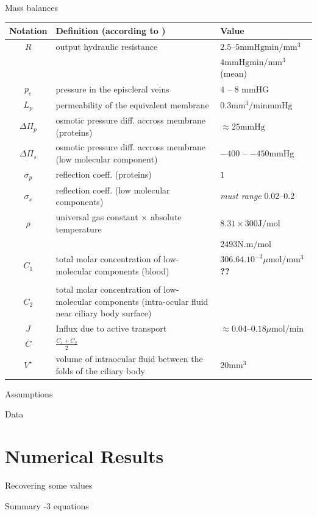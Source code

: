 \documentclass[9pt]{beamer}
\begin{document}
\begin{frame}{Mass balances}
\begin{tabular}{|c|p{}|l|}
\hline
Notation & Definition (according to \cite{lyubimov2007dynamics}) & Value \\
\hline
\hline
 $R$ & output hydraulic resistance & $2.5$--$5 \mathrm{mmHgmin}/\mathrm{mm}^3$ \cite{lyubimov2007dynamics}\\
 && $4\mathrm{mmHgmin}/\mathrm{mm}^3$ (mean) \cite{bill1975blood}\\
 \hline
 $p_e$ & pressure in the episcleral veins & $4$ -- $8$ $\mathrm{mmHG} $\\
 \hline
 $L_p$ & permeability of the equivalent membrane & $0.3 \mathrm{mm^3}/\mathrm{minmmHg}$\\
 \hline
 $\Delta \Pi_p $& osmotic pressure diff. accross membrane (proteins) &$\approx 25 \mathrm{mmHg}$\\
 \hline
 $\Delta \Pi_s $&osmotic pressure diff. accross membrane (low molecular component)& $-400$ -- $-450 \mathrm{mmHg}$\\
 \hline
 $\sigma_p$ &reflection coeff. (proteins) & $1$ \\
 \hline
 $\sigma_s$ & reflection coeff. (low molecular components) & \textit{must range} $0.02$--$0.2$ \\
 \hline
$\rho$ & universal gas constant $\times$  absolute temperature &$8.31 \times 300 \mathrm{J}/\mathrm{mol} $\\
&& $2493 \mathrm{N}.\mathrm{m}/\mathrm{mol}$\\
\hline
$C_1$& total molar concentration of low-molecular components (blood) & $306.64.10^{-3} \mu \mathrm{mol}/\mathrm{mm}^3$ \textbf{??}\cite{to2002mechanism}\\\\
\hline
$C_2$& total molar concentration of low-molecular components (intra-ocular fluid near ciliary body surface) & \\
\hline
$J$ & Influx due to active transport & $\approx 0.04$--$0.18 \mu \mathrm{mol} / \mathrm{min}$\\
\hline
$\overline{C}$& $\displaystyle{\frac{C_1+C_2}{2}}$& \\
\hline
$V^\star$ & volume of intraocular fluid between the folds of the ciliary body & $20 \mathrm{mm}^3 $\\
\hline

\end{tabular}

\end{frame}

\begin{frame}{Assumptions}

\end{frame}

\begin{frame}{Data}

\end{frame}

\section{Numerical Results}

\begin{frame}{Recovering some values}
\end{frame}

\begin{frame}{Summary}
-3 equations
\end{frame}
\end{document}
